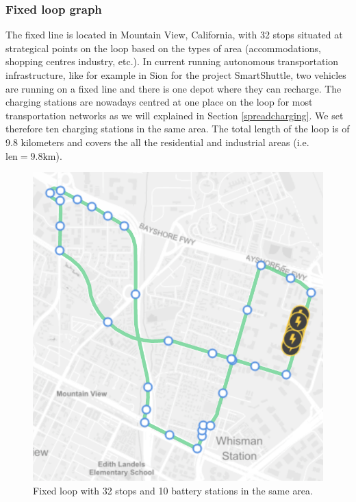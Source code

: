 \documentclass[12pt,a4paper]{article}
\begin{document}
\subsubsection{Fixed loop graph}
The fixed line is located in Mountain View, California, with 32 stops situated at strategical points on the loop based on the types of area (accommodations, shopping centres industry, etc.). In current running autonomous transportation infrastructure, like for example in Sion for the project SmartShuttle, two vehicles are running on a fixed line and there is one depot where they can recharge. The charging stations are nowadays centred at one place on the loop for most transportation networks as we will explained in Section \ref{spreadcharging}. We set therefore ten charging stations in the same area. The total length of the loop is of 9.8 kilometers and covers the all the residential and industrial areas (i.e. $\text{len} = 9.8\text{km}$).

\begin{figure}
  \centering
\includegraphics[scale=0.5]{./images/graph}
\caption{Fixed loop with 32 stops and 10 battery stations in the same area.}
\label{graph}
\end{figure}
\end{document}
